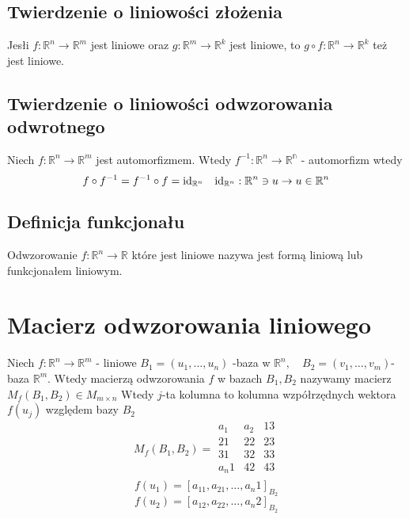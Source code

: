 \documentclass[11pt]{article}
\begin{document}
\subsection{Twierdzenie o liniowości złożenia}
Jesłi $f: \mathbb{R}^n \to \mathbb{R}^m$ jest liniowe oraz $ g: \mathbb{R}^m \to \mathbb{R}^k$ jest liniowe, to $ g \circ f : \mathbb{R}^n \to \mathbb{R}^k$ też jest liniowe.
\subsection{Twierdzenie o liniowości odwzorowania odwrotnego}
Niech $f: \mathbb{R}^n \to \mathbb{R}^m$ jest automorfizmem.
Wtedy $f^{-1} : \mathbb{R}^n \to \mathbb{R^n}$ - automorfizm
wtedy 
$$ f\circ f^{-1} = f^{-1} \circ f = \hbox{id}_{\mathbb{R}^n} \quad \hbox{id}_{\mathbb{R}^n} : \mathbb{R}^n \ni u \to u \in \mathbb{R}^n$$

\subsection{Definicja funkcjonału}
Odwzorowanie $f:\mathbb{R}^n \to \mathbb{R}$ które jest liniowe nazywa jest formą liniową lub funkcjonałem liniowym.

\section{Macierz odwzorowania liniowego}
Niech $f:\mathbb{R}^n \to \mathbb{R}^m$ - liniowe $B_1 = (u_1,\ldots,u_n)$ -baza w $\mathbb{R}^n, \quad B_{2} = (v_1,\ldots,v_m)$-baza $\mathbb{R}^m$. Wtedy macierzą odwzorowania $f$ w bazach $B_1,B_2$ nazywamy macierz $M_f(B_1,B_2) \in M_{m \times n}$ Wtedy $j$-ta kolumna to kolumna wzpółrzędnych wektora $f(u_j)$ względem bazy $B_{2}$
$$ M_f (B_1,B_2) = \begin{matrix}
	a_1 & a_2 & 13\\
	21 & 22 & 23\\
	31 & 32 & 33\\
	a_n1 & 42 & 43\\
\end{matrix}$$
$$ f(u_1) = [a_11,a_21,\ldots,a_n1]_{B_{2}}$$
$$ f(u_2) = [a_12,a_22,\ldots,a_n2]_{B_{2}}$$
\end{document}
